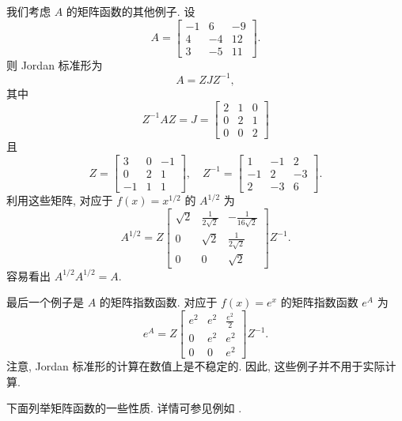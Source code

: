 \begin{Example}\label{ex:square-root-exponential-jordan}
{我们考虑 $A$ 的矩阵函数的其他例子. 设}
\[A=\begin{bmatrix}-1&6&-9\\4&-4&12\\3&-5&11\end{bmatrix}.\]
{则 Jordan 标准形为}
\[A=ZJZ^{-1},\]
{其中}
\[Z^{-1}AZ=J=\begin{bmatrix}2&1&0\\0&2&1\\0&0&2\end{bmatrix}\]
{且}
\[Z=\begin{bmatrix}3&0&-1\\0&2&1\\-1&1&1\end{bmatrix},\quad Z^{-1}=\begin{bmatrix}1&-1&2\\-1&2&-3\\2&-3&6\end{bmatrix}.\]
{利用这些矩阵, 对应于 $f(x)=x^{1/2}$ 的 $A^{1/2}$ 为}
\[A^{1/2}=Z\begin{bmatrix}\sqrt{2}&\frac{1}{2\sqrt{2}}&-\frac{1}{16\sqrt{2}}\\0&\sqrt{2}&\frac{1}{2\sqrt{2}}\\0&0&\sqrt{2}\end{bmatrix}Z^{-1}.\]
{容易看出 $A^{1/2}A^{1/2}=A$.}

{最后一个例子是 $A$ 的矩阵指数函数. 对应于 $f(x)=e^x$ 的矩阵指数函数 $e^A$ 为}
\[e^A=Z\begin{bmatrix}e^2&e^2&\frac{e^2}{2}\\0&e^2&e^2\\0&0&e^2\end{bmatrix}Z^{-1}.\]
{注意, Jordan 标准形的计算在数值上是不稳定的. 因此, 这些例子并不用于实际计算.}
\end{Example}

{下面列举矩阵函数的一些性质. 详情可参见例如 .}

